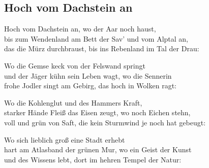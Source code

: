 
\subsection*{Hoch vom Dachstein an}
%
%

\thestrophe Hoch vom Dachstein an, wo der Aar noch haust, \\
bis zum Wendenland am Bett der Sav' und vom Alptal an, \\
das die Mürz durchbraust, bis ins Rebenland im Tal der Drau: \\

\thestrophe Wo die Gemse keck von der Felswand springt \\
und der Jäger kühn sein Leben wagt, wo die Sennerin \\
frohe Jodler singt am Gebirg, das hoch in Wolken ragt: \\

\thestrophe Wo die Kohlenglut und des Hammers Kraft, \\
starker Hände Fleiß das Eisen zeugt, wo noch Eichen stehn, \\
voll und grün von Saft, die kein Sturmwind je noch hat gebeugt: \\

\thestrophe Wo sich lieblich groß eine Stadt erhebt \\
hart am Atlasband der grünen Mur, wo ein Geist der Kunst \\
und des Wissens lebt, dort im hehren Tempel der Natur: \\
